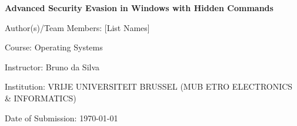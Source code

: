 \documentclass[11pt]{article}
\begin{document}
	\justifying
	
	\begin{titlepage}
		\centering
		{\Huge\bfseries Advanced Security Evasion in Windows with Hidden Commands\par}
		\vspace{1.5cm}
		{\Large Author(s)/Team Members: [List Names]\par} %
		\vspace{0.5cm}
		{\large Course: Operating Systems\par}
		\vspace{0.5cm}
		{\large Instructor: Bruno da Silva\par}
		\vspace{0.5cm}
		{\large Institution: VRIJE UNIVERSITEIT BRUSSEL (MUB ETRO ELECTRONICS & INFORMATICS)\par}
		\vspace{1.0cm}
		{\large Date of Submission: \today\par}
	\end{titlepage}
	
	\tableofcontents
	\newpage
	\listoffigures
	\newpage
	\listoftables
	\newpage
	\listlistings %
	\newpage
	
\end{document}
